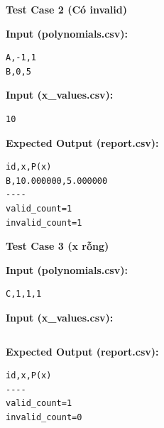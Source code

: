 \vspace{0.5cm}

\textbf{Test Case 2 (Có invalid)}

\textbf{Input (polynomials.csv):}
\begin{lstlisting}
A,-1,1
B,0,5
\end{lstlisting}

\textbf{Input (x\_values.csv):}
\begin{lstlisting}
10
\end{lstlisting}

\textbf{Expected Output (report.csv):}
\begin{lstlisting}
id,x,P(x)
B,10.000000,5.000000
----
valid_count=1
invalid_count=1
\end{lstlisting}

\vspace{0.5cm}

\textbf{Test Case 3 (x rỗng)}

\textbf{Input (polynomials.csv):}
\begin{lstlisting}
C,1,1,1
\end{lstlisting}

\textbf{Input (x\_values.csv):}
\begin{lstlisting}

\end{lstlisting}

\textbf{Expected Output (report.csv):}
\begin{lstlisting}
id,x,P(x)
----
valid_count=1
invalid_count=0
\end{lstlisting}